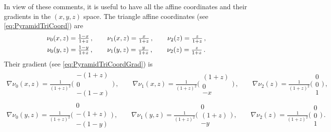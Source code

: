 In view of these comments, it is useful to have all the affine coordinates and their gradients in the $(x,y,z)$ space.
The triangle affine coordinates (see \eqref{eq:PyramidTriCoord}) are
\begin{equation}
	\begin{gathered}
		\nu_0(x,z)=\textstyle{\frac{1-x}{1+z}}\,,\qquad\nu_1(x,z)=\textstyle{\frac{x}{1+z}}\,,\qquad\nu_2(z)=\textstyle{\frac{z}{1+z}}\,,\\
		\nu_0(y,z)=\textstyle{\frac{1-y}{1+z}}\,,\qquad\nu_1(y,z)=\textstyle{\frac{y}{1+z}}\,,\qquad\nu_2(z)=\textstyle{\frac{z}{1+z}}\,.
	\end{gathered}
\end{equation}
Their gradient (see \eqref{eq:PyramidTriCoordGrad}) is
\begin{equation}
	\begin{gathered}
		\nabla\nu_0(x,z)=\textstyle{\frac{1}{(1+z)^2}}\bigg(\begin{smallmatrix}-(1+z)\\[2pt]0\\[2pt]-(1-x)\end{smallmatrix}\bigg)\,,\qquad
			\nabla\nu_1(x,z)=\textstyle{\frac{1}{(1+z)^2}}\bigg(\begin{smallmatrix}(1+z)\\[2pt]0\\[2pt]-x\end{smallmatrix}\bigg)\,,\qquad
				\nabla\nu_2(z)=\textstyle{\frac{1}{(1+z)^2}}\bigg(\begin{smallmatrix}0\\[2pt]0\\[2pt]1\end{smallmatrix}\bigg)\,,\\
		\nabla\nu_0(y,z)=\textstyle{\frac{1}{(1+z)^2}}\bigg(\begin{smallmatrix}0\\[2pt]-(1+z)\\[2pt]-(1-y)\end{smallmatrix}\bigg)\,,\qquad
			\nabla\nu_1(y,z)=\textstyle{\frac{1}{(1+z)^2}}\bigg(\begin{smallmatrix}0\\[2pt](1+z)\\[2pt]-y\end{smallmatrix}\bigg)\,,\qquad
				\nabla\nu_2(z)=\textstyle{\frac{1}{(1+z)^2}}\bigg(\begin{smallmatrix}0\\[2pt]0\\[2pt]1\end{smallmatrix}\bigg)\,.
	\end{gathered}
\end{equation}
